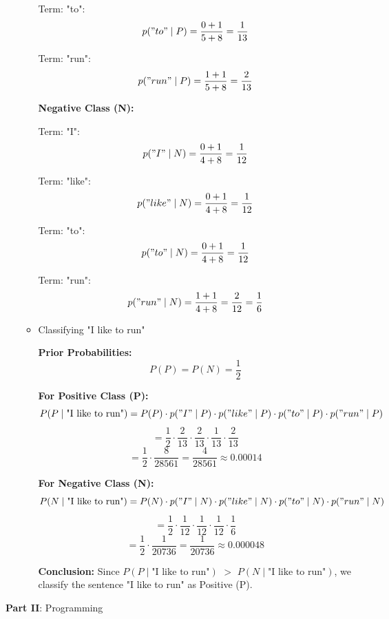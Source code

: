 \documentclass[12pt]{article}
\begin{document}
\begin{enumerate}[leftmargin=\labelsep, label=\textbf{\arabic*.)}]
\begin{itemize}
                    Term: "to":
                    \[
                        p("to" \mid P) = \frac{0 + 1}{5 + 8} = \frac{1}{13}
                    \]

                    Term: "run":
                    \[
                        p("run" \mid P) = \frac{1 + 1}{5 + 8} = \frac{2}{13}
                    \]

                    \textbf{Negative Class (N):}

                    Term: "I":
                    \[
                        p("I" \mid N) = \frac{0 + 1}{4 + 8} = \frac{1}{12}
                    \]

                    Term: "like":
                    \[
                        p("like" \mid N) = \frac{0 + 1}{4 + 8} = \frac{1}{12}
                    \]

                    Term: "to":
                    \[
                        p("to" \mid N) = \frac{0 + 1}{4 + 8} = \frac{1}{12}
                    \]

                    Term: "run":
                    \[
                        p("run" \mid N) = \frac{1 + 1}{4 + 8} = \frac{2}{12} = \frac{1}{6}
                    \]

              \item Classifying "I like to run"

                    \textbf{Prior Probabilities:}
                    \[
                        P(P) = P(N) = \frac{1}{2}
                    \]

                    \textbf{For Positive Class (P):}
                    \[
                        P(P \mid \text{"I  like to run"}) = P(P) \cdot p("I" \mid P) \cdot p("like" \mid P) \cdot p("to" \mid P) \cdot p("run" \mid P)
                    \]
                    \[
                        = \frac{1}{2} \cdot \frac{2}{13} \cdot \frac{2}{13} \cdot \frac{1}{13} \cdot \frac{2}{13}
                    \]
                    \[
                        = \frac{1}{2} \cdot \frac{8}{28561} = \frac{4}{28561} \approx 0.00014
                    \]

                    \textbf{For Negative Class (N):}
                    \[
                        P(N \mid \text{"I  like to run"}) = P(N) \cdot p("I" \mid N) \cdot p("like" \mid N) \cdot p("to" \mid N) \cdot p("run" \mid N)
                    \]
                    \[
                        = \frac{1}{2} \cdot \frac{1}{12} \cdot \frac{1}{12} \cdot \frac{1}{12} \cdot \frac{1}{6}
                    \]
                    \[
                        = \frac{1}{2} \cdot \frac{1}{20736} = \frac{1}{20736} \approx 0.000048
                    \]

                    \textbf{Conclusion:}
                    Since \( P(P \mid \text{"I  like to run"}) \) \(>\) \( P(N \mid \text{"I  like to run"}) \), we classify the sentence "I like to run" as Positive (P).

          \end{itemize}
\end{enumerate}
\large{\textbf{Part II}: Programming}\normalsize
\end{document}
